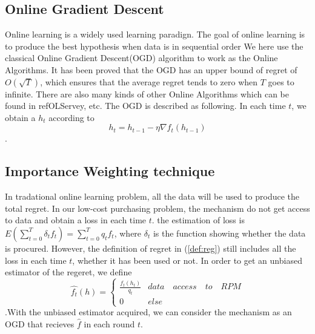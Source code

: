 \documentclass[10pt,conference,compsocconf,letterpaper]{IEEEtran}
\begin{document}
\subsection{Online Gradient Descent}
Online learning is a widely used learning paradign. The goal of online learning is to produce the best hypothesis when data is in sequential order
We here use the classical Online Gradient Descent(OGD) algorithm to work as the Online Algorithms. It has been proved that the OGD has an upper bound of regret of $O(\sqrt{T})$, which ensures that the average regret tends to zero when $T$ goes to infinite. There are also many kinds of other Online Algorithms which can be found in ref{OLServey}, etc. The OGD is described as following. In each time $t$, we obtain a $h_t$ according to
\begin{equation}
h_t=h_{t-1}-\eta \nabla f_t(h_{t-1})
\end{equation}.



\subsection{Importance Weighting technique}

In tradational online learning problem, all the data will be used to produce the total regret. In our low-cost purchasing problem, the mechanism do not get access to data and obtain a loss in each time $t$.  the estimation of loss is $E(\sum_{t=0}^T\delta_t f_t)=\sum_{t=0}^T q_t f_t$, where $\delta_t$ is the function showing whether the data is procured. However, the definition of regret in (\ref{def:reg}) still includes all the loss in each time $t$, whether it has been used or not.  In order to get an unbiased estimator of the regeret, we define
\begin{equation}
\hat{f_t}(h)=\begin{cases}{}
  \frac{f_t(h_t)}{q_t} & data\quad access\quad to\quad RPM  \\
  0 & else 
\end{cases}
\end{equation}
.With the unbiased estimator acquired, we can consider the mechanism as an OGD that recieves $\hat{f}$ in each round $t$.
\end{document}
